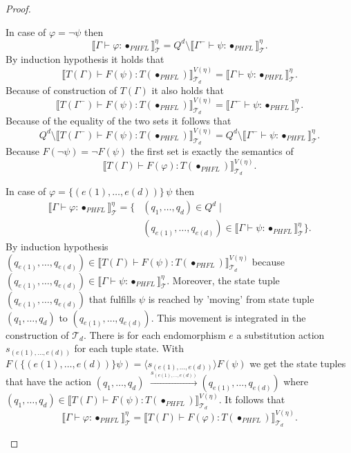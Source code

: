 \begin{proof}
\begin{compactitem}
        \item In case of $\varphi = \neg \psi$ then
        \[\llbracket \Gamma \vdash \varphi \colon \bullet_{PHFL} \rrbracket^\eta_\mathcal{T} = Q^d \setminus
        \llbracket
        \Gamma^-
        \vdash \psi \colon \bullet_{PHFL} \rrbracket^\eta_\mathcal{T}.\]
        By induction hypothesis it holds that \[\llbracket T(\Gamma) \vdash F(\psi) \colon T
        (\bullet_{PHFL}) \rrbracket^{V(\eta)}_{\mathcal{T}_d} = \llbracket \Gamma
        \vdash \psi \colon \bullet_{PHFL} \rrbracket^\eta_\mathcal{T}.\]
        Because of construction of $T(\Gamma)$ it also holds that
        \[\llbracket T(\Gamma^-) \vdash F(\psi) \colon T
        (\bullet_{PHFL}) \rrbracket^{V(\eta)}_{\mathcal{T}_d} = \llbracket \Gamma^-
        \vdash \psi \colon \bullet_{PHFL} \rrbracket^\eta_\mathcal{T}.\]
        Because of the equality of the two sets it follows that
        \[Q^d \setminus \llbracket T(\Gamma^-) \vdash F(\psi) \colon T(\bullet_{PHFL}) \rrbracket^{V(\eta)
        }_{\mathcal{T}_d} =
        Q^d \setminus \llbracket \Gamma^- \vdash \psi \colon \bullet_{PHFL} \rrbracket^\eta_\mathcal{T}.\]
        Because $F(\neg \psi) = \neg F(\psi)$ the first set is exactly the semantics of
        \[\llbracket T(\Gamma) \vdash F(\varphi) \colon T(\bullet_{PHFL}) \rrbracket^{V(\eta)}_{\mathcal{T}_d}.\]

        \item In case of $\varphi = \{(e(1), \dots, e(d))\}\,\psi$ then
        \begin{align*}
            \llbracket \Gamma \vdash \varphi \colon \bullet_{PHFL} \rrbracket^\eta_\mathcal{T} = \{&(q_1, \dots,
            q_d) \in Q^d \mid \\&(q_{e(1)}, \dots, q_{e(d)}) \in \llbracket \Gamma \vdash \psi
            \colon \bullet_{PHFL}
            \rrbracket ^\eta_\mathcal{T}\}.
        \end{align*}
        By induction hypothesis $({q_{e(1)}}, \dots, {q_{e(d)}}) \in \llbracket T(\Gamma) \vdash F(\psi) \colon T
        (\bullet_{PHFL}) \rrbracket^{V(\eta)}_{\mathcal{T}_d}$ because $({q_{e(1)}}, \dots, {q_{e(d)}}) \in
        \llbracket \Gamma \vdash \psi \colon \bullet_{PHFL} \rrbracket^\eta_\mathcal{T}$.
        Moreover, the state tuple $({q_{e(1)}}, \dots, {q_{e(d)}})$ that fulfills $\psi$ is reached by 'moving' from
        state tuple $({q_{1}}, \dots, {q_{d}})$ to $({q_{e(1)}}, \dots, {q_{e(d)}})$. This movement is
        integrated in the construction of $\mathcal{T}_d$. There is for each endomorphism $e$ a
        substitution action $s_{(e(1), \dots, e(d))}$ for each tuple state. With $F(\{(e(1), \dots, e(d))\}
        \psi) = \langle s_{(e(1), \dots, e(d))} \rangle F(\psi)$ we get the state tuples that have the action $(q_1,
        \dots, q_d)$ $ \overset{s_{(e(1), \dots, e(d))}}{\rightarrow} (q_{e
        (1)}, \dots, q_{e(d)})$ where $(q_1, \dots, q_d) \in \llbracket T(\Gamma) \vdash F(\psi) \colon T
        (\bullet_{PHFL}) \rrbracket^{V(\eta)}_{\mathcal{T}_d}$.
        It follows that
        \[\llbracket \Gamma \vdash \varphi \colon \bullet_{PHFL} \rrbracket^\eta_\mathcal{T} = \llbracket T(\Gamma)
        \vdash F(\varphi) \colon T(\bullet_{PHFL}) \rrbracket^{V(\eta)}_{\mathcal{T}_d}.\]


\end{compactitem}
\end{proof}
